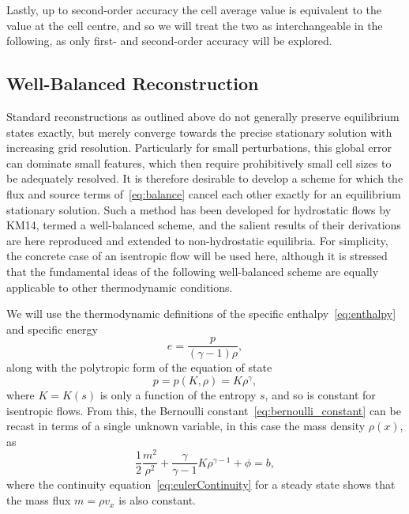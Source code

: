 Lastly, up to second-order accuracy the cell average value is equivalent to the value at the cell centre, and so we will treat the two as interchangeable in the following, as only first- and second-order accuracy will be explored. 

\subsection{Well-Balanced Reconstruction}
\label{subsec:wellBalanced}

Standard reconstructions as outlined above do not generally preserve equilibrium states exactly, but merely converge towards the precise stationary solution with increasing grid resolution. Particularly for small perturbations, this global error can dominate small features, which then require prohibitively small cell sizes to be adequately resolved. It is therefore desirable to develop a scheme for which the flux and source terms of~\eqref{eq:balance} cancel each other exactly for an equilibrium stationary solution. Such a method has been developed for hydrostatic flows by KM14, termed a well-balanced scheme, and the salient results of their derivations are here reproduced and extended to non-hydrostatic equilibria. For simplicity, the concrete case of an isentropic flow will be used here, although it is stressed that the fundamental ideas of the following well-balanced scheme are equally applicable to other thermodynamic conditions.

We will use the thermodynamic definitions of the specific enthalpy~\eqref{eq:enthalpy} and specific energy
\begin{equation}
e=\frac{p}{(\gamma-1)\rho},
\end{equation}
along with the polytropic form of the equation of state
\begin{equation} \label{eq:polyEOS}
p=p(K,\rho)=K\rho^{\gamma},
\end{equation}
where $K=K(s)$ is only a function of the entropy $s$, and so is constant for isentropic flows. From this, the Bernoulli constant~\eqref{eq:bernoulli_constant} can be recast in terms of a single unknown variable, in this case the mass density $\rho(x)$, as
\begin{equation} \label{eq:bernoulli}
\frac{1}{2}\frac{m^2}{\rho^2}+\frac{\gamma}{\gamma-1}K\rho^{\gamma-1}+\phi=b,
\end{equation}
where the continuity equation~\eqref{eq:eulerContinuity} for a steady state shows that the mass flux $m=\rho v_x$ is also constant.

